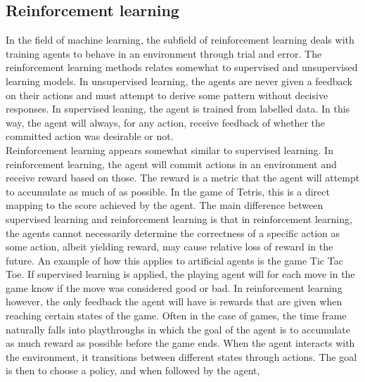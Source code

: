 \subsection{Reinforcement learning \label{RL}}

In the field of machine learning, the subfield of reinforcement learning
deals with training agents to behave in an environment through
trial and error. 
The reinforcement learning methods relates somewhat 
to supervised and unsupervised learning models. In unsupervised 
learning, the agents are never given a feedback on their actions
and must attempt to derive some pattern without decisive responses.
In supervised leaning, the agent is trained from labelled data.
In this way, the agent will always, for any action, receive 
feedback of whether the committed action was desirable or not.\\
Reinforcement learning appears somewhat similar to supervised learning.
In reinforcement learning, the agent will commit actions in an environment
and receive reward based on those. The reward is a metric that the agent 
will attempt to accumulate
as much of as possible. In the game of Tetris, this is a direct mapping to 
the score achieved by the agent.
 The main difference between supervised
learning and reinforcement learning is that in reinforcement learning,
the agents cannot necessarily determine the correctness 
of a specific action as some action, albeit yielding reward,
may cause relative loss of reward in the future. An example of how this applies 
to artificial agents is the game Tic Tac Toe. If supervised learning
is applied, the playing agent will for each move in the game know
if the move was considered good or bad. In reinforcement learning however,
the only feedback the agent will have is rewards that are given 
when reaching certain states of the game. 
Often in the case of games, the 
time frame naturally falls into playthroughs in which the 
goal of the agent is to accumulate as much reward as possible 
before the game ends. When the agent interacts 
with the environment, it transitions between different states through 
actions. 
The goal is then to choose a policy, and when followed by the agent,
